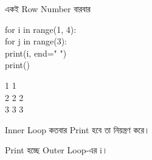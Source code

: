 

\begin{codeoutputbox}{একই Row Number বারবার}

\noindent
\begin{minipage}[t]{0.53\linewidth}
\codeheading

\begin{english}
\ttfamily
for i in range(1, 4):\\
\hspace*{4mm}for j in range(3):\\
\hspace*{8mm}print(i, end=" ")\\
\hspace*{4mm}print()
\end{english}

\end{minipage}
\hfill
\begin{minipage}[t]{0.43\linewidth}
\outputheading

\begin{english}
 1 1\\
2 2 2\\
3 3 3
\end{english}

\medskip

Inner Loop কতবার Print হবে তা নিয়ন্ত্রণ করে।

Print হচ্ছে Outer Loop-এর
\textenglish{\ttfamily i}।

\end{minipage}

\end{codeoutputbox}



